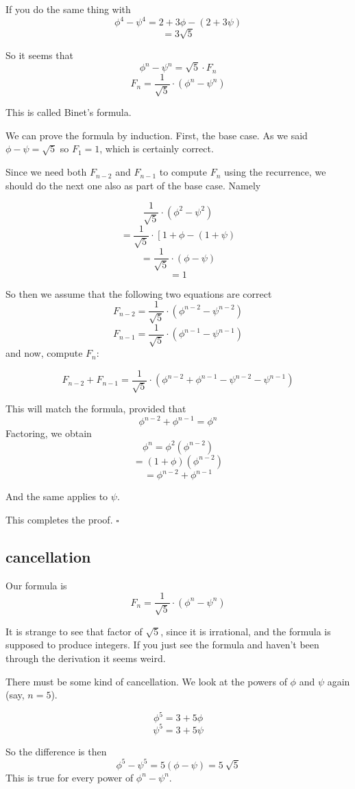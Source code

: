 \documentclass[11pt, oneside]{article}
\begin{document}
If you do the same thing with 
\[ \phi^4 - \psi^4 = 2 + 3 \phi - (2 + 3 \psi) \]
\[ = 3 \sqrt{5} \]

So it seems that
\[ \phi^n - \psi^n = \sqrt{5} \cdot F_n \]
\[ F_n = \frac{1}{\sqrt{5}} \cdot (\phi^n - \psi^n) \]

This is called Binet's formula.  

We can prove the formula by induction.  First, the  base case.  As we said $\phi - \psi = \sqrt{5}$ so $F_1 = 1$, which is certainly correct.  

Since we need both $F_{n-2}$ and $F_{n-1}$ to compute $F_n$ using the recurrence, we should do the next one also as part of the base case.  Namely

\[ \frac{1}{\sqrt{5}} \cdot (\phi^2 - \psi^2) \]
\[ = \frac{1}{\sqrt{5}} \cdot \ [ \ 1 + \phi - (1 + \psi) \] 
\[ =  \frac{1}{\sqrt{5}} \cdot (\phi - \psi) \]
\[ = 1 \]

So then we assume that the following two equations are correct
\[ F_{n-2} = \frac{1}{\sqrt{5}} \cdot (\phi^{n-2} - \psi^{n-2}) \]
\[ F_{n-1} = \frac{1}{\sqrt{5}} \cdot (\phi^{n-1} - \psi^{n-1}) \]
and now, compute $F_n$:

\[ F_{n-2} + F_{n-1} = \frac{1}{\sqrt{5}} \cdot (\phi^{n-2} + \phi^{n-1} -  \psi^{n-2} - \psi^{n-1}  ) \]

This will match the formula, provided that
\[ \phi^{n-2} + \phi^{n-1} = \phi^n \]
Factoring, we obtain
\[ \phi^n = \phi^2(\phi^{n-2}) \]
\[ = (1 + \phi)(\phi^{n-2}) \]
\[ = \phi^{n-2} + \phi^{n-1} \]

And the same applies to $\psi$.

This completes the proof.  $\square$

\subsection*{cancellation}
Our formula is
\[ F_n = \frac{1}{\sqrt{5}} \cdot (\phi^n - \psi^n) \]

It is strange to see that factor of $\sqrt{5}$, since it is irrational, and the formula is supposed to produce integers.  If you just see the formula and haven't been through the derivation it seems weird.

There must be some kind of cancellation.  We look at the powers of $\phi$ and $\psi$ again (say, $n = 5$).

\[ \phi^5 = 3 + 5 \phi \]
\[ \psi^5 = 3 + 5 \psi \]

So the difference is then
\[ \phi^5 - \psi^5 = 5(\phi - \psi) = 5 \ \sqrt{5} \]
This is true for every power of $\phi^n - \psi^n$.
\end{document}
